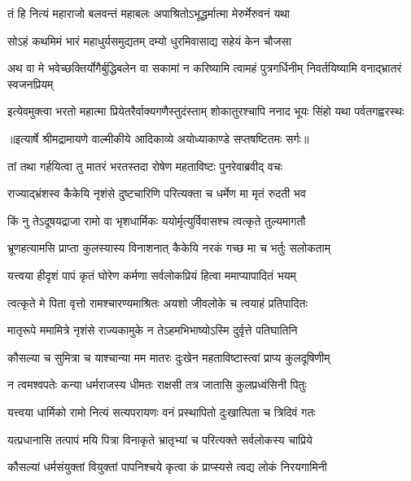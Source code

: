 \twolineshloka
{तं हि नित्यं महाराजो बलवन्तं महाबलः}
{अपाश्रितोऽभूद्धर्मात्मा मेरुर्मेरुवनं यथा} %

\twolineshloka
{सोऽहं कथमिमं भारं महाधुर्यसमुद्यतम्}
{दम्यो धुरमिवासाद्य सहेयं केन चौजसा} %

\threelineshloka
{अथ वा मे भवेच्छक्तिर्योगैर्बुद्धिबलेन वा}
{सकामां न करिष्यामि त्वामहं पुत्रगर्धिनीम्}
{निवर्तयिष्यामि वनाद्भ्रातरं स्वजनप्रियम्} %

\fourlineindentedshloka
{इत्येवमुक्त्वा भरतो महात्मा}
{प्रियेतरैर्वाक्यगणैस्तुदंस्ताम्}
{शोकातुरश्चापि ननाद भूयः}
{सिंहो यथा पर्वतगह्वरस्थः} %


{॥इत्यार्षे श्रीमद्रामायणे वाल्मीकीये आदिकाव्ये अयोध्याकाण्डे सप्तषष्टितमः सर्गः॥}


\twolineshloka
{तां तथा गर्हयित्वा तु मातरं भरतस्तदा}
{रोषेण महताविष्टः पुनरेवाब्रवीद् वचः} %

\twolineshloka
{राज्याद्भ्रंशस्व कैकेयि नृशंसे दुष्टचारिणि}
{परित्यक्ता च धर्मेण मा मृतं रुदती भव} %

\twolineshloka
{किं नु तेऽदूषयद्राजा रामो वा भृशधार्मिकः}
{ययोर्मृत्युर्विवासश्च त्वत्कृते तुल्यमागतौ} %

\twolineshloka
{भ्रूणहत्यामसि प्राप्ता कुलस्यास्य विनाशनात्}
{कैकेयि नरकं गच्छ मा च भर्तुः सलोकताम्} %

\twolineshloka
{यत्त्वया हीदृशं पापं कृतं घोरेण कर्मणा}
{सर्वलोकप्रियं हित्वा ममाप्यापादितं भयम्} %

\twolineshloka
{त्वत्कृते मे पिता वृत्तो रामश्चारण्यमाश्रितः}
{अयशो जीवलोके च त्वयाहं प्रतिपादितः} %

\twolineshloka
{मातृरूपे ममामित्रे नृशंसे राज्यकामुके}
{न तेऽहमभिभाष्योऽस्मि दुर्वृत्ते पतिघातिनि} %

\twolineshloka
{कौसल्या च सुमित्रा च याश्चान्या मम मातरः}
{दुःखेन महताविष्टास्त्वां प्राप्य कुलदूषिणीम्} %

\twolineshloka
{न त्वमश्वपतेः कन्या धर्मराजस्य धीमतः}
{राक्षसी तत्र जातासि कुलप्रध्वंसिनी पितुः} %

\twolineshloka
{यत्त्वया धार्मिको रामो नित्यं सत्यपरायणः}
{वनं प्रस्थापितो दुःखात्पिता च त्रिदिवं गतः} %

\twolineshloka
{यत्प्रधानासि तत्पापं मयि पित्रा विनाकृते}
{भ्रातृभ्यां च परित्यक्ते सर्वलोकस्य चाप्रिये} %

\twolineshloka
{कौसल्यां धर्मसंयुक्तां वियुक्तां पापनिश्चये}
{कृत्वा कं प्राप्स्यसे त्वद्य लोकं निरयगामिनी} %

